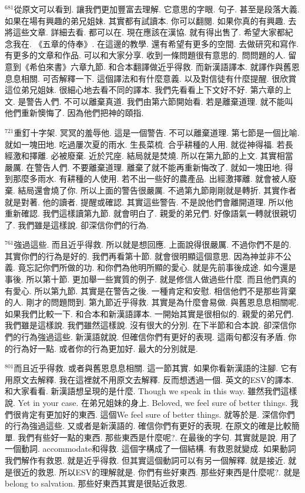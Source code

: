 \documentclass{book}
\begin{document}
$^{681}$從原文可以看到.
讓我們更加豐富去理解.
它意思的字眼.
句子.
甚至是段落大義.
如果在場有興趣的弟兄姐妹.
其實都有試讀本.
你可以翻閱.
如果你真的有興趣.
去將這些文章.
詳細去看.
都可以在.
現在應該在漢協.
就有得出售了.
希望大家都紀念我在.
《五章的侍奉》.
在這邊的教學.
還有希望有更多的空間.
去做研究和寫作.
有更多的文章和作品.
可以和大家分享.
收到一條問題很有意思的.
問問題的人.
留意到《希伯來書》六章九節.
和合本翻譯做近乎得救.
而新漢語譯本.
就譯作與舊恩息息相關.
可否解釋一下.
這個譯法和有什麼意義.
以及對信徒有什麼提醒.
很欣賞這位弟兄姐妹.
很細心地去看不同的譯本.
我們先看看上下文好不好.
第六章的上文.
是警告人們.
不可以離棄真道.
我們由第六節開始看.
若是離棄道理.
就不能叫他們重新懊悔了.
因為他們把神的頤指.

$^{721}$重釘十字架.
冥冥的羞辱他.
這是一個警告.
不可以離棄道理.
第七節是一個比喻.
就如一塊田地.
吃過屢次夏的雨水.
生長菜梳.
合乎耕種的人用.
就從神得福.
若長經激和擇離.
必被廢棄.
近於咒座.
結局就是焚燒.
所以在第九節的上文.
其實相當嚴厲.
在警告人們.
不要離棄道理.
離棄了就不能再重新悔改了.
就如一塊田地.
得到那麼多雨水.
有耕種的人使用.
若不出一些好的農產品.
出經激擇離.
就會被人廢棄.
結局還會燒了你.
所以上面的警告很嚴厲.
不過第九節剛剛就是轉折.
其實作者就是對著.
他的讀者.
提醒或確認.
其實這些警告.
不是說他們會離開道理.
所以他重新確認.
我們這樣讀第九節.
就會明白了.
親愛的弟兄們.
好像語氣一轉就很親切了.
我們雖是這樣說.
卻深信你們的行為.

$^{761}$強過這些.
而且近乎得救.
所以就是想回應.
上面說得很嚴厲.
不過你們不是的.
其實你們的行為是好的.
我們再看第十節.
就會很明顯這個意思.
因為神並非不公義.
竟忘記你們所做的功.
和你們為他明所顯的愛心.
就是先前事後成途.
如今還是事後.
所以第十節.
更加舉一些實質的例子.
就是修信人做過些什麼.
而且他們真的有愛心.
所以第九節.
其實是在警告之後.
一種肯定和安慰.
相信他們不是那些背棄的人.
剛才的問題問到.
第九節近乎得救.
其實是為什麼會易做.
與舊恩息息相關呢.
如果我們比較一下.
和合本和新漢語譯本.
一開始其實是很相似的.
親愛的弟兄們.
我們雖是這樣說.
我們雖然這樣說.
沒有很大的分別.
在下半節和合本說.
卻深信你們的行為強過這些.
新漢語就說.
但確信你們有更好的表現.
這兩句都沒有矛盾.
你的行為好一點.
或者你的行為更加好.
最大的分別就是.

$^{801}$而且近乎得救.
或者與舊恩息息相關.
這一節其實.
如果你看新漢語的注腳.
它有用原文去解釋.
我在這裡就不用原文去解釋.
反而想透過一個.
英文的ESV的譯本.
和大家看看.
新漢語想呈現的是什麼.
Though we speak in this way.
雖然我們這樣說.
Yet in your case.
在弟兄姐妹的身上.
Beloved, we feel sure of better things.
我們很肯定有更加好的東西.
這個We feel sure of better things.
就等於是.
深信你們的行為強過這些.
又或者是新漢語的.
確信你們有更好的表現.
在原文的確是比較簡單.
我們有些好一點的東西.
那些東西是什麼呢?.
在最後的字句.
其實就是說.
用了一個動詞.
accommodate和得救.
這個字構成了一個結構.
有救恩就變成.
如果動詞我們解作有救恩.
就是近乎得救.
但其實這個動詞可以有另一個解釋.
就是接近.
就是很近的救恩.
所以ESV的理解就是.
你們有些好東西.
那些好東西是什麼呢?.
就是belong to salvation.
那些好東西其實是很貼近救恩.
\end{document}
